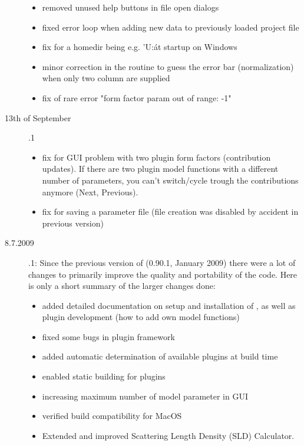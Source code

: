 \begin{description}
\begin{itemize}
          \item removed unused help buttons in file open dialogs
          \item fixed error loop when adding new data to previously loaded project file
          \item fix for a homedir being e.g. 'U:\' at startup on Windows
          \item minor correction in the routine to guess the error bar (normalization) when only two column are supplied
          \item fix of rare error "form factor param out of range: -1"
        \end{itemize}
    \item[13th of September] .1
        \begin{itemize}
          \item fix for GUI problem with two plugin form factors (contribution updates).
                If there are two plugin model functions with a different number of parameters,
                you can't switch/cycle trough the contributions anymore (Next, Previous).
          \item fix for saving a parameter file (file creation was disabled by accident in previous version)
        \end{itemize}
        \item[8.7.2009] .1: Since the previous version of
                    \SASfit (0.90.1, January 2009) there were a lot of changes to
                    primarily improve the quality and portability of the code. Here is
                    only a short summary of the larger changes done:
        \begin{itemize}
            \item added detailed documentation on setup and installation of \SASfit,
                  as well as plugin development (how to add own model functions)
            \item fixed some bugs in plugin framework
            \item added automatic determination of available plugins at build time
            \item enabled static building for plugins
            \item increasing maximum number of model parameter in GUI
            \item verified build compatibility for MacOS
            \item Extended and improved Scattering Length Density (SLD) Calculator.

\end{itemize}
\end{description}
